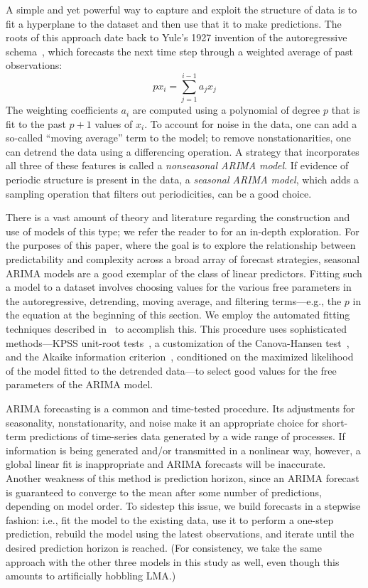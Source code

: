 A simple and yet powerful way to capture and exploit the structure of
data is to fit a hyperplane to the dataset and then use that it to
make predictions.  The roots of this approach date back to Yule's 1927
invention of the autoregressive schema~\cite{weigend93}, which
forecasts the next time step through a weighted average of past
observations: $$px_i = \sum_{j=1}^{i-1} a_j x_j$$ The weighting
coefficients $a_i$ are computed using a polynomial of degree $p$ that
is fit to the past $p+1$ values of $x_i$.  To account for noise in the
data, one can add a so-called ``moving average'' term to the model; to
remove nonstationarities, one can detrend the data using a
differencing operation.  A strategy that incorporates all three of
these features is called a \emph{nonseasonal ARIMA model}.  If
evidence of periodic structure is present in the data, a
\emph{seasonal ARIMA model}, which adds a sampling operation that
filters out periodicities, can be a good choice.

There is a vast amount of theory and literature regarding the
construction and use of models of this type; we refer the reader to
\cite{davislinearts} for an in-depth exploration.  For the purposes of
this paper, where the goal is to explore the relationship between
predictability and complexity across a broad array of forecast
strategies, seasonal ARIMA models are a good exemplar of the class of
linear predictors.  Fitting such a model to a dataset involves
choosing values for the various free parameters in the autoregressive,
detrending, moving average, and filtering terms---e.g., the $p$ in the
equation at the beginning of this section.  We employ the automated
fitting techniques described in~\cite{autoARIMA} to accomplish this.
This procedure uses sophisticated methods---KPSS unit-root
tests~\cite{KPSSunit}, a customization of the Canova-Hansen
test~\cite{Canova1995}, and the Akaike information
criterion~\cite{akaike1974}, conditioned on the maximized likelihood
of the model fitted to the detrended data---to select good values for
the free parameters of the ARIMA model.

ARIMA forecasting is a common and time-tested procedure.  Its
adjustments for seasonality, nonstationarity, and noise make it an
appropriate choice for short-term predictions of time-series data
generated by a wide range of processes.  If information is being
generated and/or transmitted in a nonlinear way, however, a global
linear fit is inappropriate and ARIMA forecasts will be inaccurate.
Another weakness of this method is prediction horizon, since an ARIMA
forecast is guaranteed to converge to the mean after some number of
predictions, depending on model order.  To sidestep this issue, we
build forecasts in a stepwise fashion: i.e., fit the model to the
existing data, use it to perform a one-step prediction, rebuild the
model using the latest observations, and iterate until the desired
prediction horizon is reached.  (For consistency, we take the same
approach with the other three models in this study as well, even
though this amounts to artificially hobbling LMA.)

